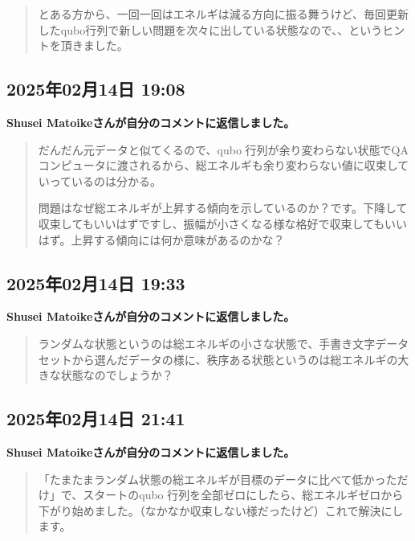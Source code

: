 \begin{quote}
とある方から、一回一回はエネルギは減る方向に振る舞うけど、毎回更新したqubo行列で新しい問題を次々に出している状態なので、、というヒントを頂きました。
\end{quote}

\subsection*{2025年02月14日 19:08}

\textbf{Shusei Matoikeさんが自分のコメントに返信しました。}

\begin{quote}
だんだん元データと似てくるので、qubo 行列が余り変わらない状態でQAコンピュータに渡されるから、総エネルギも余り変わらない値に収束していっているのは分かる。

問題はなぜ総エネルギが上昇する傾向を示しているのか？です。下降して収束してもいいはずですし、振幅が小さくなる様な格好で収束してもいいはず。上昇する傾向には何か意味があるのかな？
\end{quote}

\subsection*{2025年02月14日 19:33}

\textbf{Shusei Matoikeさんが自分のコメントに返信しました。}

\begin{quote}
ランダムな状態というのは総エネルギの小さな状態で、手書き文字データセットから選んだデータの様に、秩序ある状態というのは総エネルギの大きな状態なのでしょうか？
\end{quote}

\subsection*{2025年02月14日 21:41}

\textbf{Shusei Matoikeさんが自分のコメントに返信しました。}

\begin{quote}
「たまたまランダム状態の総エネルギが目標のデータに比べて低かっただけ」で、スタートのqubo 行列を全部ゼロにしたら、総エネルギゼロから下がり始めました。（なかなか収束しない様だったけど）これで解決にします。
\end{quote}

